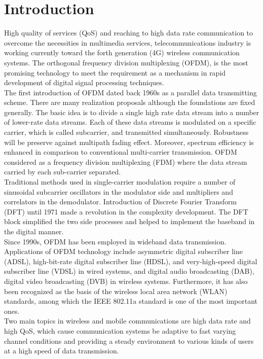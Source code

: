 \chapter{Introduction}
\label{sec:chapter_1}

High quality of services (QoS) and reaching to high data rate communication to overcome the necessities in multimedia services, telecommunications industry is working currently toward the forth generation (4G) wireless communication systems. The orthogonal frequency division multiplexing (OFDM), is the most promising technology to meet the requirement as a mechanism in rapid development of digital signal processing techniques. \citep{FDSS_13}\\

The first introduction of OFDM dated back 1960s as a parallel data transmitting scheme. There are many realization proposals although the foundations are fixed generally. The basic idea is to divide a single high rate data stream into a number of lower-rate data 
streams. Each of these data streams is modulated on a specific carrier, which is called 
subcarrier, and transmitted simultaneously. Robustness will be preserve against multipath fading effect. Moreover, spectrum efficiency is enhanced in comparison to conventional multi-carrier transmission. OFDM considered as a frequency division multiplexing (FDM) where the data stream carried by each sub-carrier separated.\\

Traditional methods used in single-carrier modulation require a number of sinusoidal subcarrier oscillators in the modulator side and multipliers and correlators in the demodulator. Introduction of Discrete Fourier Transform (DFT) until 1971 made a revolution in the complexity development. The DFT block simplified the two side processes and helped to implement the baseband in the digital manner.\\
Since 1990s, OFDM has been employed in wideband data transmission. Applications of OFDM technology include asymmetric digital subscriber line (ADSL), high-bit-rate digital subscriber line (HDSL), and very-high-speed digital subscriber line (VDSL) in wired systems, and digital audio broadcasting (DAB), digital video broadcasting (DVB) in wireless systems. Furthermore, it has also been recognized as the basis of the wireless local area network (WLAN) standards, among which the IEEE 802.11a standard is one of the most important ones.\\

Two main topics in wireless and mobile communications are high data rate and high QoS, which cause communication systems be adaptive to fast varying channel conditions and providing a steady environment to various kinds of users at a high speed of data transmission.\\

